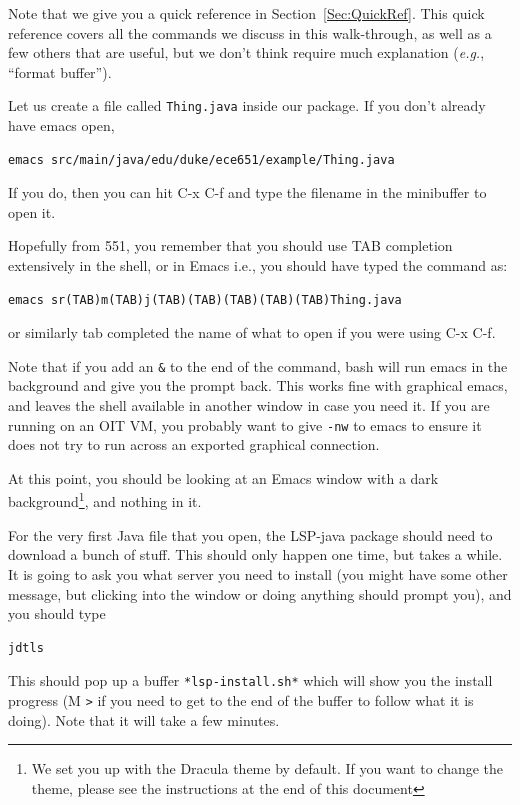 \documentclass[12pt]{article}
\begin{document}
Note that we give you a quick reference in Section~\ref{Sec:QuickRef}.  This
quick reference covers all the commands we discuss in this walk-through,
as well as a few others that are useful, but we don't think require
much explanation (\emph{e.g.}, ``format buffer'').


Let us create a file called \verb+Thing.java+ inside our package.  If you don't
already have emacs open, 
\begin{verbatim}
emacs src/main/java/edu/duke/ece651/example/Thing.java 
\end{verbatim}
If you do, then you can hit C-x C-f and type the filename in the minibuffer to open it.

Hopefully from 551, you remember that you should use TAB completion
extensively in the shell, or in Emacs i.e., you should have typed the command as:
\begin{verbatim}
emacs sr(TAB)m(TAB)j(TAB)(TAB)(TAB)(TAB)(TAB)Thing.java
\end{verbatim}
or similarly tab completed the name of what to open if you were using C-x C-f.


Note that if you add an \verb+&+ to the end of the command,
bash will run emacs in the background and give you the prompt back.
This works fine with graphical emacs, and leaves the shell available
in another window in case you need it.  If you are running on an OIT VM,
you probably want to give \verb+-nw+ to emacs to ensure it does not try to run
across an exported graphical connection.

At this point, you should be looking at an Emacs window with a dark
background\footnote{We set you up with the Dracula theme by default.
  If you want to change the theme, please see the instructions at the end
of this document}, and nothing in it.

For the very first Java file that you open, the LSP-java package
should need to download a bunch of stuff.  This should only happen one
time, but takes a while.  It is going to ask you what server you need
to install (you might have some other message, but clicking into the
window or doing anything should prompt you), and you should type
\begin{verbatim}
jdtls
\end{verbatim}

This should pop up a buffer \verb+*lsp-install.sh*+ which will show
you the install progress (M \verb+>+ if you need to get to the end of the buffer
to follow what it is doing).  Note that it will take a few minutes.
\end{document}
